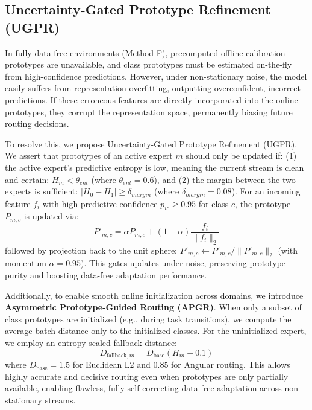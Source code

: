 \documentclass{article}
\theoremstyle{plain}
\theoremstyle{definition}
\theoremstyle{remark}
\begin{document}
\subsection{Uncertainty-Gated Prototype Refinement (UGPR)}
In fully data-free environments (Method F), precomputed offline calibration prototypes are unavailable, and class prototypes must be estimated on-the-fly from high-confidence predictions. However, under non-stationary noise, the model easily suffers from representation overfitting, outputting overconfident, incorrect predictions. If these erroneous features are directly incorporated into the online prototypes, they corrupt the representation space, permanently biasing future routing decisions.

To resolve this, we propose Uncertainty-Gated Prototype Refinement (UGPR). We assert that prototypes of an active expert $m$ should only be updated if: (1) the active expert's predictive entropy is low, meaning the current stream is clean and certain: $H_m < \theta_{ent}$ (where $\theta_{ent} = 0.6$), and (2) the margin between the two experts is sufficient: $|H_0 - H_1| \ge \delta_{margin}$ (where $\delta_{margin} = 0.08$). For an incoming feature $f_i$ with high predictive confidence $p_{ic} \ge 0.95$ for class $c$, the prototype $P_{m, c}$ is updated via:
\begin{equation}
    P'_{m, c} = \alpha P_{m, c} + (1 - \alpha) \frac{f_i}{\|f_i\|_2}
\end{equation}
followed by projection back to the unit sphere: $P'_{m, c} \leftarrow P'_{m, c} / \|P'_{m, c}\|_2$ (with momentum $\alpha = 0.95$). This gates updates under noise, preserving prototype purity and boosting data-free adaptation performance.

Additionally, to enable smooth online initialization across domains, we introduce \textbf{Asymmetric Prototype-Guided Routing (APGR)}. When only a subset of class prototypes are initialized (e.g., during task transitions), we compute the average batch distance only to the initialized classes. For the uninitialized expert, we employ an entropy-scaled fallback distance:
\begin{equation}
    D_{\text{fallback}, m} = D_{\text{base}} (H_m + 0.1)
\end{equation}
where $D_{\text{base}} = 1.5$ for Euclidean L2 and $0.85$ for Angular routing. This allows highly accurate and decisive routing even when prototypes are only partially available, enabling flawless, fully self-correcting data-free adaptation across non-stationary streams.
\end{document}

